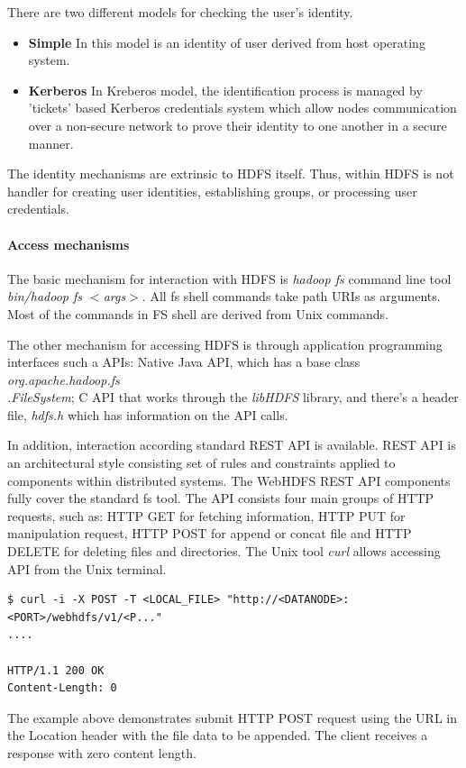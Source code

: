 \documentclass[a4paper,12pt,oneside]{report}
\begin{document}
	There are two different models for checking the user's identity.
	\begin{itemize}
		\item \textbf{Simple}  In this model is an identity of user derived from host
		operating system.
		\item \textbf{Kerberos} In Kreberos model, the identification process is managed
		by 'tickets' based  Kerberos credentials system which allow nodes communication
		over a non-secure network to prove their identity to one another in a secure
		manner.\cite{kerberos}
	\end{itemize}
	
	The identity mechanisms are  extrinsic to HDFS itself. Thus, within HDFS is not
	handler for creating user identities, establishing groups, or processing user
	credentials.
	
	\paragraph{Access mechanisms}
	The basic mechanism for interaction with HDFS is \textit{hadoop fs}  command
	line tool \textit{bin/hadoop fs $<$args$>$}. 
	All fs shell commands take path URIs as arguments. Most of the commands in FS
	shell are derived from Unix commands. 
	
	The other mechanism for accessing HDFS is through application programming
	interfaces such a APIs: Native Java API, which has a base class
	\textit{org.apache.hadoop.fs\\.FileSystem}; C API that works through the
	\textit{libHDFS} library, and there's a header file, \textit{hdfs.h} which has
	information on the API calls.
	
	In addition, interaction according standard REST API is available. REST API is
	an architectural style consisting set of rules and constraints applied to
	components within distributed systems. The WebHDFS REST API components fully
	cover the standard fs tool. The API consists four main groups of HTTP requests,
	such as: HTTP GET for fetching information, HTTP PUT for manipulation request,
	HTTP POST for append or concat file and HTTP DELETE for deleting files and
	directories.\cite{rest_api}
	The Unix tool \textit{curl}  allows accessing API from the Unix terminal. 
	\begin{footnotesize}
		\begin{lstlisting}[style=mybash]
$ curl -i -X POST -T <LOCAL_FILE> "http://<DATANODE>:<PORT>/webhdfs/v1/<P..."
....

HTTP/1.1 200 OK
Content-Length: 0
		\end{lstlisting}
	\end{footnotesize}
	The example above demonstrates submit  HTTP POST request using the URL in the
	Location header with the file data to be appended. The client receives a
	response with zero content length.
	
\end{document}
